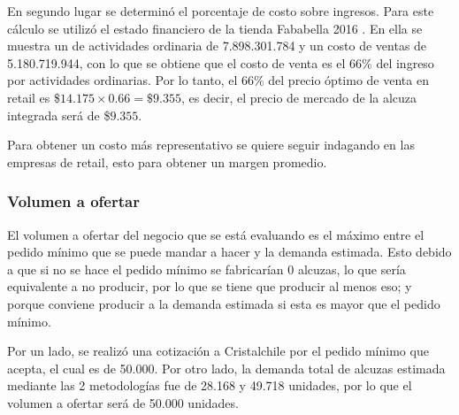 En segundo lugar se determinó el porcentaje de costo sobre ingresos. Para este cálculo se utilizó el estado financiero de la tienda Fababella 2016 \cite{falabella}. En ella se muestra un de actividades ordinaria de 7.898.301.784 y un costo de ventas de 5.180.719.944, con lo que se obtiene que el costo de venta es el 66\% del ingreso por actividades ordinarias. Por lo tanto, el 66\% del precio óptimo de venta en retail es
\$$14.175 \times 0.66=\$9.355$, es decir, el precio de mercado de la alcuza integrada será de \$$9.355$.

Para obtener un costo más representativo se quiere seguir indagando en las empresas de retail, esto para obtener un margen promedio.

\subsubsection{Volumen a ofertar}

El volumen a ofertar del negocio que se está evaluando es el máximo entre el pedido mínimo que se puede mandar a hacer y la demanda estimada. Esto debido a que si no se hace el pedido mínimo se fabricarían 0 alcuzas, lo que sería equivalente a no producir, por lo que se tiene que producir al menos eso; y porque conviene producir a la demanda estimada si esta es mayor que el pedido mínimo.

Por un lado, se realizó una cotización a Cristalchile por el pedido mínimo que acepta, el cual es de 50.000. Por otro lado, la demanda total de alcuzas estimada mediante las 2 metodologías fue de 28.168 y 49.718 unidades, por lo que el volumen a ofertar será de 50.000 unidades.
